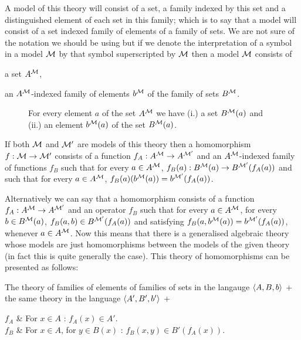 A model of this theory will consist of a set, a family indexed by this set and a distinguished element of each set in this family; which is to say that a model will consist of a set indexed family of elements of a family of sets.
%
We are not sure of the notation we should be using but if we denote the interpretation of a symbol in a model $\mathcal{M}$ by that symbol superscripted by $\mathcal{M}$ then a model $\mathcal{M}$ consists of 
\begin{enumerate*}[(i.)]
\item a set $A^{\mathcal{M}}$,
\item an $A^{\mathcal{M}}$-indexed family of elements $b^{\mathcal{M}}$ of the family of sets $B^{\mathcal{M}}$.
\end{enumerate*}

\begin{figure}
  \caption{For every element $a$ of the set $A^{\mathcal{M}}$ we have (i.) a set $B^{\mathcal{M}}(a)$ and (ii.) an element $b^{\mathcal{M}}(a)$ of the set $B^{\mathcal{M}}(a)$.}
\end{figure}


If both $\mathcal{M}$ and $\mathcal{M}'$ are models of this theory then a homomorphism $f : \mathcal{M} \to \mathcal{M}'$ consists of a function $f_A : A^{\mathcal{M}} \to A^{\mathcal{M}'}$ and an $A^{\mathcal{M}}$-indexed family of functions $f_B$ such that for every $a \in A^{\mathcal{M}}$, $f_B(a) : B^{\mathcal{M}}(a) \to B^{\mathcal{M}'}(f_A(a))$ and such that for every $a \in A^{\mathcal{M}}$, $f_B(a)(b^{\mathcal{M}}(a)) = b^{\mathcal{M}'}(f_A(a))$.

Alternatively we can say that a homomorphism consists of a function $f_A : A^{\mathcal{M}} \to A^{\mathcal{M}'}$ and an operator $f_B$ such that for every $a \in A^{\mathcal{M}}$, for every $b \in B^{\mathcal{M}}(a)$, $f_B(a,b) \in B^{\mathcal{M}'}(f_A(a))$ and satisfying $f_B(a,b^{\mathcal{M}}(a)) = b^{\mathcal{M}'}(f_A(a))$, whenever $a \in A^{\mathcal{M}}$.
%
Now this means that there is a generalised algebraic theory whose models are just homomorphisms between the models of the given theory (in fact this is quite generally the case).
%
This theory of homomorphisms can be presented as follows:

The theory of families of elements of families of sets in the langauge $\langle A,B,b \rangle$ + the same theory in the language $\langle A',B',b' \rangle$ + \\
\begin{theoryspec}
  $f_A$ & For $x \in A$ : $f_A(x) \in A'$. \\
  $f_B$ & For $x \in A$, for $y \in B(x)$ : $f_B(x,y) \in B'(f_A(x))$. \\
  \oneaxiom
\end{theoryspec}

